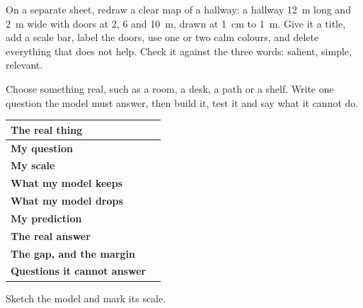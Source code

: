 \clearpage
\thispagestyle{fancy}
On a separate sheet, redraw a clear map of a hallway: a hallway 12~m long and 2~m wide with doors at 2, 6 and 10~m, drawn at 1~cm to 1~m. Give it a title, add a scale bar, label the doors, use one or two calm colours, and delete everything that does not help. Check it against the three words: salient, simple, relevant.

\begin{center}
\end{center}

\clearpage
\thispagestyle{fancy}
Choose something real, such as a room, a desk, a path or a shelf. Write one question the model must answer, then build it, test it and say what it cannot do.\par\medskip
\renewcommand{\arraystretch}{1.7}
\begin{tabularx}{\linewidth}{|>{\sffamily\small\bfseries}p{3.0cm}|X|}
\hline
The real thing & \\ \hline
My question & \\ \hline
My scale & \\ \hline
What my model keeps & \\ \hline
What my model drops & \\ \hline
My prediction & \\ \hline
The real answer & \\ \hline
The gap, and the margin & \\ \hline
Questions it cannot answer & \\ \hline
\end{tabularx}
\par\bigskip\bigskip
\noindent Sketch the model and mark its scale.\par\medskip
{}

